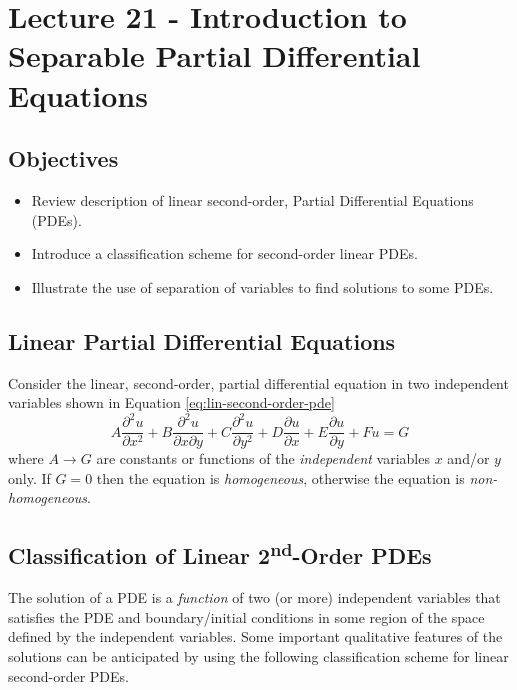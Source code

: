 \chapter{Lecture 21 - Introduction to Separable Partial Differential Equations}
\label{ch:lec21}
\section{Objectives}
\begin{itemize}
\item Review description of linear second-order, Partial Differential Equations (PDEs).
\item Introduce a classification scheme for second-order linear PDEs.
\item Illustrate the use of separation of variables to find solutions to some PDEs.
\end{itemize}

\section{Linear Partial Differential Equations}

Consider the linear, second-order, partial differential equation in two independent variables shown in Equation \ref{eq:lin-second-order-pde}
\begin{equation}
A\frac{\partial^2u}{\partial x^2} + B\frac{\partial^2 u}{\partial x \partial y} + C\frac{\partial^2 u}{\partial y^2} + D \frac{\partial u}{\partial x} + E\frac{\partial u}{\partial y} + Fu = G
\label{eq:lin-second-order-pde}
\end{equation}
where $A\rightarrow G$ are constants or functions of the \emph{independent} variables $x$ and/or $y$ only.  If $G=0$ then the equation is \emph{homogeneous}, otherwise the equation is \emph{non-homogeneous}.

\section{Classification of Linear 2\textsuperscript{nd}-Order PDEs}
The solution of a PDE is a \emph{function} of two (or more) independent variables that satisfies the PDE and boundary/initial conditions in some region of the space defined by the independent variables.  Some important qualitative features of the solutions can be anticipated by using the following classification scheme for linear second-order PDEs.

